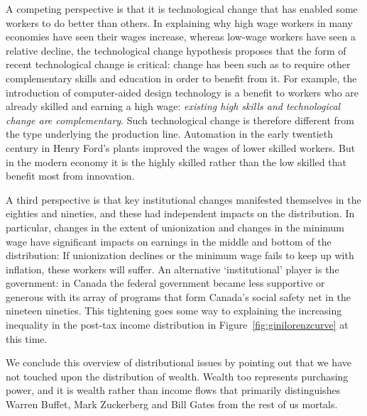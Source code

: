 A competing perspective is that it is technological change that has enabled some workers to do better than others. In explaining why high wage workers in many economies have seen their wages increase, whereas low-wage workers have seen a relative decline, the technological change hypothesis proposes that the form of recent technological change is critical: change has been such as to require other complementary skills and education in order to benefit from it. For example, the introduction of computer-aided design technology is a benefit to workers who are already skilled and earning a high wage: \textit{existing high skills and technological change are complementary}. Such technological change is therefore different from the type underlying the production line. Automation in the early twentieth century in Henry Ford's plants improved the wages of lower skilled workers. But in the modern economy it is the highly skilled rather than the low skilled that benefit most from innovation.

A third perspective is that key institutional changes manifested themselves in the eighties and nineties, and these had independent impacts on the distribution. In particular, changes in the extent of unionization and changes in the minimum wage have significant impacts on earnings in the middle and bottom of the distribution: If unionization declines or the minimum wage fails to keep up with inflation, these workers will suffer. An alternative `institutional' player is the government: in Canada the federal government became less supportive or generous with its array of programs that form Canada's social safety net in the nineteen nineties. This tightening goes some way to explaining the increasing inequality in the post-tax income distribution in Figure~\ref{fig:ginilorenzcurve} at this time.

We conclude this overview of distributional issues by pointing out that we have not touched upon the distribution of wealth. Wealth too represents purchasing power, and it is wealth rather than income flows that primarily distinguishes Warren Buffet, Mark Zuckerberg and Bill Gates from the rest of us mortals.